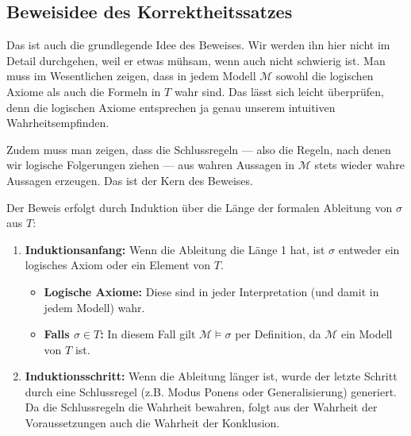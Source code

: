\subsection{Beweisidee des Korrektheitssatzes}
\begin{spoken-clean}[00:20:06 - 00:22:28]
Das ist auch die grundlegende Idee des Beweises. Wir werden ihn hier nicht im Detail durchgehen, weil er etwas mühsam, wenn auch nicht schwierig ist. Man muss im Wesentlichen zeigen, dass in jedem Modell $\mathcal{M}$ sowohl die logischen Axiome als auch die Formeln in $T$ wahr sind. Das lässt sich leicht überprüfen, denn die logischen Axiome entsprechen ja genau unserem intuitiven Wahrheitsempfinden.

Zudem muss man zeigen, dass die Schlussregeln --- also die Regeln, nach denen wir logische Folgerungen ziehen --- aus wahren Aussagen in $\mathcal{M}$ stets wieder wahre Aussagen erzeugen. Das ist der Kern des Beweises.
\end{spoken-clean}

\begin{math-stroke}
\begin{short-proof}[Beweisidee]
Der Beweis erfolgt durch Induktion über die Länge der formalen Ableitung von $\sigma$ aus $T$:
\begin{enumerate}[label=\textbf{(\arabic*)}]
    \item \textbf{Induktionsanfang:} Wenn die Ableitung die Länge 1 hat, ist $\sigma$ entweder ein logisches Axiom oder ein Element von $T$.
    \begin{itemize}
        \item \textbf{Logische Axiome:} Diese sind in jeder Interpretation (und damit in jedem Modell) wahr.
        \item \textbf{Falls $\sigma \in T$:} In diesem Fall gilt $\mathcal{M} \models \sigma$ per Definition, da $\mathcal{M}$ ein Modell von $T$ ist.
    \end{itemize}
    \item \textbf{Induktionsschritt:} Wenn die Ableitung länger ist, wurde der letzte Schritt durch eine Schlussregel (z.B. Modus Ponens oder Generalisierung) generiert. Da die Schlussregeln die Wahrheit bewahren, folgt aus der Wahrheit der Voraussetzungen auch die Wahrheit der Konklusion.
\end{enumerate}
\end{short-proof}
\end{math-stroke}

\begin{ai-global-state-checkpoint-invisible-content}
\end{ai-global-state-checkpoint-invisible-content}

